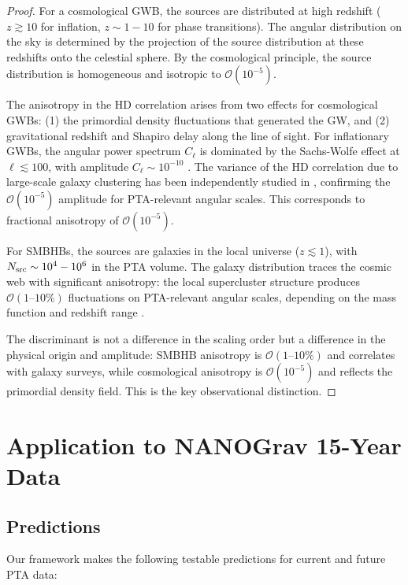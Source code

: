 \documentclass[11pt,a4paper]{article}
\begin{document}
\begin{proof}
For a cosmological GWB, the sources are distributed at high redshift ($z \gtrsim 10$ for inflation, $z \sim 1-10$ for phase transitions). The angular distribution on the sky is determined by the projection of the source distribution at these redshifts onto the celestial sphere. By the cosmological principle, the source distribution is homogeneous and isotropic to $\mathcal{O}(10^{-5})$.

The anisotropy in the HD correlation arises from two effects for cosmological GWBs: (1) the primordial density fluctuations that generated the GW, and (2) gravitational redshift and Shapiro delay along the line of sight. For inflationary GWBs, the angular power spectrum $C_\ell$ is dominated by the Sachs-Wolfe effect at $\ell \lesssim 100$, with amplitude $C_\ell \sim 10^{-10}$ \cite{Gong:2021}. The variance of the HD correlation due to large-scale galaxy clustering has been independently studied in \cite{Grimm:2025}, confirming the $\mathcal{O}(10^{-5})$ amplitude for PTA-relevant angular scales. This corresponds to fractional anisotropy of $\mathcal{O}(10^{-5})$.

For SMBHBs, the sources are galaxies in the local universe ($z \lesssim 1$), with $N_{\rm src} \sim 10^4-10^6$ in the PTA volume. The galaxy distribution traces the cosmic web with significant anisotropy: the local supercluster structure produces $\mathcal{O}(1\text{--}10\%)$ fluctuations on PTA-relevant angular scales, depending on the mass function and redshift range \cite{Gong:2021}.

The discriminant is not a difference in the scaling order but a difference in the physical origin and amplitude: SMBHB anisotropy is $\mathcal{O}(1\text{--}10\%)$ and correlates with galaxy surveys, while cosmological anisotropy is $\mathcal{O}(10^{-5})$ and reflects the primordial density field. This is the key observational distinction.
\end{proof}

\section{Application to NANOGrav 15-Year Data}\label{sec:phenomenology}

\subsection{Predictions}\label{sec:predictions}

Our framework makes the following testable predictions for current and future PTA data:
\end{document}
